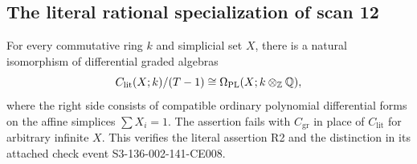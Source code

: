 \subsection{The literal rational specialization of scan 12}

\begin{proposition}[A-025: \status{Proved}; the all-space $T=1$ specialization]
\label{sa08:A025}
For every commutative ring $k$ and simplicial set $X$, there is a
natural isomorphism of differential graded algebras
\[
 C_{\mathrm{lit}}(X;k)/(T-1)
   \cong \Omega_{\mathrm{PL}}(X;k\otimes_{\mathbb Z}\mathbb Q),
\]
where the right side consists of compatible ordinary polynomial
differential forms on the affine simplices $\sum X_i=1$.
The assertion fails with $C_{\mathrm{gr}}$ in place of
$C_{\mathrm{lit}}$ for arbitrary infinite $X$. This verifies the
literal assertion R2 and the distinction in its attached check event
S3-136-002-141-CE008.
\end{proposition}
